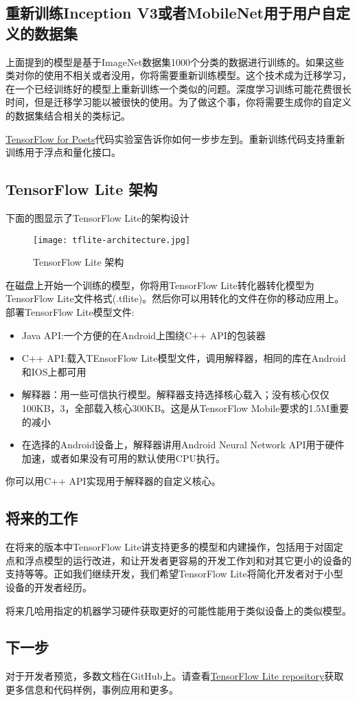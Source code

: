 \subsection{重新训练Inception V3或者MobileNet用于用户自定义的数据集}
上面提到的模型是基于ImageNet数据集1000个分类的数据进行训练的。如果这些类对你的使用不相关或者没用，你将需要重新训练模型。这个技术成为迁移学习，在一个已经训练好的模型上重新训练一个类似的问题。深度学习训练可能花费很长时间，但是迁移学习能以被很快的使用。为了做这个事，你将需要生成你的自定义的数据集结合相关的类标记。

\href{https://codelabs.developers.google.com/codelabs/tensorflow-for-poets/?hl=zh-cn}{TensorFlow for Poets}代码实验室告诉你如何一步步左到。重新训练代码支持重新训练用于浮点和量化接口。
\subsection{TensorFlow Lite 架构}
下面的图显示了TensorFlow Lite的架构设计
\begin{figure}[H]
\centering
\texttt{[image: tflite-architecture.jpg]}
\caption{TensorFlow Lite 架构}
\end{figure}
在磁盘上开始一个训练的模型，你将用TensorFlow Lite转化器转化模型为TensorFlow Lite文件格式(.tflite)。然后你可以用转化的文件在你的移动应用上。
部署TensorFlow Lite模型文件:
\begin{itemize}
\item Java API:一个方便的在Android上围绕C++ API的包装器
\item C++ API:载入TEnsorFlow Lite模型文件，调用解释器，相同的库在Android和IOS上都可用
\item 解释器：用一些可信执行模型。解释器支持选择核心载入；没有核心仅仅100KB，3，全部载入核心300KB。这是从TensorFlow Mobile要求的1.5M重要的减小
\item 在选择的Android设备上，解释器讲用Android Neural Network API用于硬件加速，或者如果没有可用的默认使用CPU执行。
\end{itemize}
你可以用C++ API实现用于解释器的自定义核心。
\subsection{将来的工作}
在将来的版本中TensorFlow Lite讲支持更多的模型和内建操作，包括用于对固定点和浮点模型的运行改进，和让开发者更容易的开发工作刘和对其它更小的设备的支持等等。正如我们继续开发，我们希望TensorFlow Lite将简化开发者对于小型设备的开发者经历。

将来几哈用指定的机器学习硬件获取更好的可能性能用于类似设备上的类似模型。
\subsection{下一步}
对于开发者预览，多数文档在GitHub上。请查看\href{https://github.com/tensorflow/tensorflow/tree/master/tensorflow/contrib/lite}{TensorFlow Lite repository}获取更多信息和代码样例，事例应用和更多。


